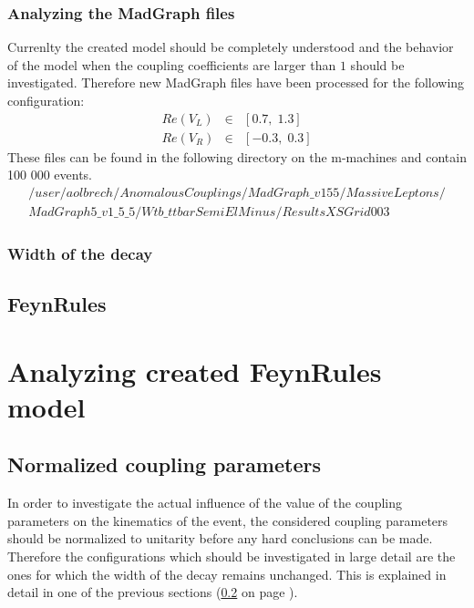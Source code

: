 \documentclass[a4paper,12pt]{report}
\begin{document}
\subsection{Analyzing the MadGraph files}\label{subsec:MadGraphFiles}
Currenlty the created model should be completely understood and the behavior of the model when the coupling coefficients are larger than $1$ should be investigated. Therefore new MadGraph files have been processed for the following configuration:
\begin{eqnarray*}
  Re(V_L) & \in & \left[  0.7, \; 1.3\right] \\
  Re(V_R) & \in & \left[ -0.3, \; 0.3\right]
\end{eqnarray*}
These files can be found in the following directory on the m-machines and contain 100 000 events.
\begin{eqnarray*}
  /user/aolbrech/AnomalousCouplings/MadGraph\_v155/MassiveLeptons/\\ MadGraph5\_v1\_5\_5/Wtb\_ttbarSemiElMinus/ResultsXSGrid003
\end{eqnarray*}

\subsection{Width of the decay}\label{subsec:DecayWidth}

\section{FeynRules}

\chapter{Analyzing created FeynRules model}

\section{Normalized coupling parameters}
In order to investigate the actual influence of the value of the coupling parameters on the kinematics of the event, the considered coupling parameters should be normalized to unitarity before any hard conclusions can be made.
Therefore the configurations which should be investigated in large detail are the ones for which the width of the decay remains unchanged. This is explained in detail in one of the previous sections (\ref{subsec:DecayWidth} on page \pageref{subsec:DecayWidth}).
\end{document}
